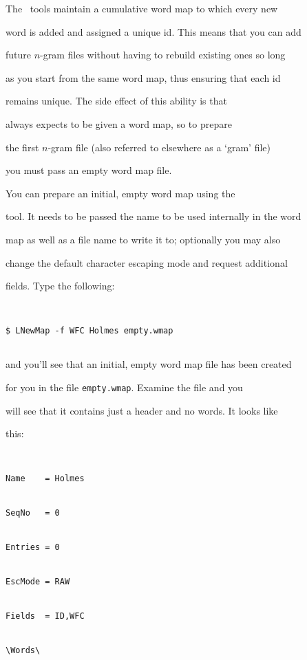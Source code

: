 The \HTK\ tools maintain a cumulative word map to which every new


word is added and assigned a unique id.  This means that you can add


future $n$-gram files without having to rebuild existing ones so long


as you start from the same word map, thus ensuring that each id


remains unique.  The side effect of this ability is that


 always expects to be given a word map, so to prepare


the first $n$-gram file (also referred to elsewhere as a `gram' file)


you must pass an empty word map file.





You can prepare an initial, empty word map using the 


tool.  It needs to be passed the name to be used internally in the word


map as well as a file name to write it to;  optionally you may also


change the default character escaping mode and request additional


fields.  Type the following:


\begin{verbatim}


$ LNewMap -f WFC Holmes empty.wmap


\end{verbatim} %


and you'll see that an initial, empty word map file has been created


for you in the file \texttt{empty.wmap}.  Examine the file and you


will see that it contains just a header and no words.  It looks like


this:


\begin{verbatim}


Name    = Holmes


SeqNo   = 0


Entries = 0


EscMode = RAW


Fields  = ID,WFC


\Words\


\end{verbatim}


